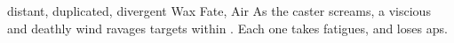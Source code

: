   {distant, duplicated, divergent}%
  {Wax}%
  {Fate, Air}%
  {}%
  {As the caster screams, a viscious and deathly wind ravages  targets within \spellRange.
    Each one takes  \glspl{fatigue}, and loses  \glspl{ap}.
  }%
  {}
